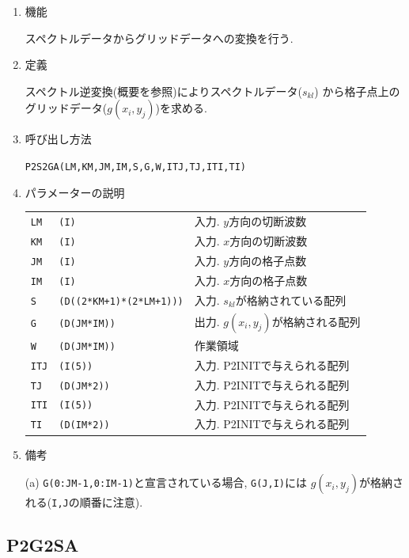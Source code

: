 \documentclass[a4j,fleqn]{jarticle}
\begin{document}
\begin{enumerate}

\item 機能 

スペクトルデータからグリッドデータへの変換を行う.

\item 定義

スペクトル逆変換(概要を参照)によりスペクトルデータ($s_{kl}$)
から格子点上のグリッドデータ($g(x_i,y_j)$)を求める.

\item 呼び出し方法 

{\tt P2S2GA(LM,KM,JM,IM,S,G,W,ITJ,TJ,ITI,TI)}
  
\item パラメーターの説明

\begin{tabular}{lll}
{\tt LM} & {\tt (I)} & 入力. $y$方向の切断波数\\
{\tt KM} & {\tt (I)} & 入力. $x$方向の切断波数\\
{\tt JM} & {\tt (I)} & 入力. $y$方向の格子点数\\
{\tt IM} & {\tt (I)} & 入力. $x$方向の格子点数\\
{\tt S} & {\tt (D((2*KM+1)*(2*LM+1)))} & 入力. $s_{kl}$が格納されている配列\\
{\tt G} & {\tt (D(JM*IM))} & 出力. $g(x_i,y_j)$が格納される配列\\
{\tt W} & {\tt (D(JM*IM))} & 作業領域\\
{\tt ITJ} & {\tt (I(5))} & 入力. P2INITで与えられる配列\\
{\tt TJ} & {\tt (D(JM*2))} & 入力. P2INITで与えられる配列\\
{\tt ITI} & {\tt (I(5))} & 入力. P2INITで与えられる配列\\
{\tt TI} & {\tt (D(IM*2))} & 入力. P2INITで与えられる配列
\end{tabular}

\item 備考

(a) {\tt G(0:JM-1,0:IM-1)}と宣言されている場合, {\tt G(J,I)}には
    $g(x_i,y_j)$が格納される({\tt I,J}の順番に注意).

\end{enumerate}


\subsection{P2G2SA}
\end{document}
